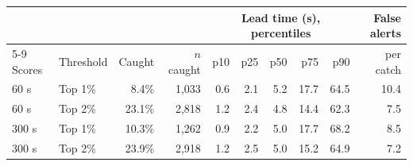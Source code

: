 \begin{tabular}{llrrrrrrrr}
\toprule
 & & & & \multicolumn{5}{c}{Lead time (s), percentiles} & False alerts \\
\cmidrule(lr){5-9}
Scores & Threshold & Caught & $n$ caught & p10 & p25 & p50 & p75 & p90 & per catch \\
\midrule
60 s & Top 1\% & 8.4\% & 1{,}033 & 0.6 & 2.1 & 5.2 & 17.7 & 64.5 & 10.4 \\
60 s & Top 2\% & 23.1\% & 2{,}818 & 1.2 & 2.4 & 4.8 & 14.4 & 62.3 & 7.5 \\
300 s & Top 1\% & 10.3\% & 1{,}262 & 0.9 & 2.2 & 5.0 & 17.7 & 68.2 & 8.5 \\
300 s & Top 2\% & 23.9\% & 2{,}918 & 1.2 & 2.5 & 5.0 & 15.2 & 64.9 & 7.2 \\
\bottomrule
\end{tabular}
